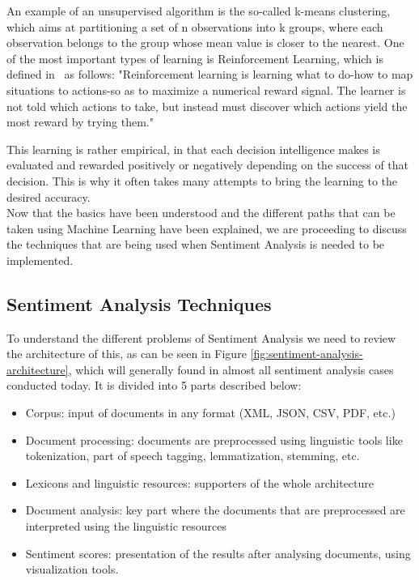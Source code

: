 An example of an unsupervised algorithm is the so-called k-means clustering, which aims at partitioning a set of n observations into k groups, where each observation belongs to the group whose mean value is closer to the nearest.
One of the most important types of learning is Reinforcement Learning, which is defined in~\cite{sutton2018reinforcement} as follows: "Reinforcement learning is learning what to do-how to map situations to actions-so as to maximize a numerical reward signal. The learner is not told which actions to take, but instead must discover which actions yield the most reward by trying them."

This learning is rather empirical, in that each decision intelligence makes is evaluated and rewarded positively or negatively depending on the success of that decision. This is why it often takes many attempts to bring the learning to the desired accuracy.\\

Now that the basics have been understood and the different paths that can be taken using Machine Learning have been explained, we are proceeding to discuss the techniques that are being used when Sentiment Analysis is needed to be implemented.


\subsection{Sentiment Analysis Techniques}

To understand the different problems of Sentiment Analysis we need to review the architecture of this, as can be seen in Figure \ref{fig:sentiment-analysis-architecture}, which will generally found in almost all sentiment analysis cases conducted today. It is divided into 5 parts described below:


\begin{itemize}
    \item Corpus: input of documents in any format (XML, JSON, CSV, PDF, etc.)
    \item Document processing: documents are preprocessed using linguistic tools like tokenization, part of speech tagging, lemmatization, stemming, etc.
    \item Lexicons and linguistic resources: supporters of the whole architecture
    \item Document analysis: key part where the documents that are preprocessed are interpreted using the linguistic resources
    \item Sentiment scores: presentation of the results after analysing documents, using visualization tools.
\end{itemize}


